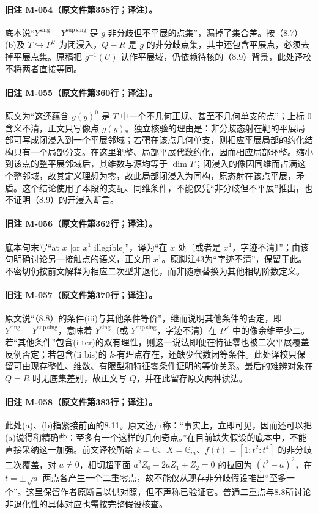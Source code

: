 \paragraph{旧注 M-054（原文件第358行；译注）。}
底本说“${Y^{\mathrm{sing}}}-{Y^{\mathrm{sup\,sing}}}$ 是 $g$ 非分歧但不平展的点集”，漏掉了集合差。按（8.7）(b)及 $T\hookrightarrow P^\vee$ 为闭浸入，$Q-R$ 是 $g$ 的非分歧点集，其中还包含平展点，必须去掉平展点集。原稿把 $g^{-1}(U)$ 认作平展域，仍依赖待核的（8.9）背景，此处译校不将两者直接等同。

\paragraph{旧注 M-055（原文件第360行；译注）。}
原文为“这还蕴含 $g(y)^0$ 是 $T$ 中一个不几何正规、甚至不几何单支的点”；上标 $0$ 含义不清，正文只写像点 $g(y)$。独立核验的理由是：非分歧态射在靶的平展局部可写成闭浸入到一个平展邻域；若靶在该点几何单支，则相应平展局部的约化结构只有一个局部分支。在这里靶整、局部平展代数约化，因而相应局部环整。缩小到该点的整平展邻域后，其维数与源均等于 $\dim T$；闭浸入的像因同维而占满这个整邻域，故其定义理想为零，故此局部闭浸入为同构，原态射在该点平展，矛盾。这个结论使用了本段的支配、同维条件，不能仅凭“非分歧但不平展”推出，也不证明（8.9）的开浸入断言。

\paragraph{旧注 M-056（原文件第362行；译注）。}
底本句末写“at $x$ [or $x^1$ illegible]”，译为“在 $x$ 处〔或者是 $x^1$，字迹不清〕”；由该句明确讨论另一接触点的语义，正文用 $x^1$。原脚注43为“字迹不清”，保留于此。不密切仍按前文解释为相应二次型非退化，而非随意替换为其他相切阶数定义。

\paragraph{旧注 M-057（原文件第370行；译注）。}
原文说“（8.8）的条件(iii)与其他条件等价”，继而说明其他条件的否定，即 ${Y^{\mathrm{sing}}}={Y^{\mathrm{sup\,sing}}}$，意味着 ${Y^{\mathrm{sing}}}$〔或 ${Y^{\mathrm{sup\,sing}}}$，字迹不清〕在 $P^\vee$ 中的像余维至少二。若“其他条件”包含(i ter)的双有理性，则这一说法即便在特征零也被二次平展覆盖反例否定；若包含(ii bis)的 $k$-有理点存在，还缺少代数闭等条件。此处译校只保留可由现存整性、维数、有限型和特征零条件证明的等价关系。最后的难辨对象在 $Q=R$ 时无底集差别，故正文写 $Q$，并在此留存原文两种读法。

\paragraph{旧注 M-058（原文件第383行；译注）。}
此处(a)、(b)指紧接前面的8.11。原文还声称：“事实上，立即可见，因而还可以把(a)说得稍精确些：至多有一个这样的几何奇点。”在目前缺失假设的底本中，不能直接采纳这一加强。前文译校所给 $k=\mathbb C$、$X=\mathbb G_m$、$f(t)=[1:t^2:t^4]$ 的非分歧二次覆盖，对 $a\ne0$，相切超平面 $a^2Z_0-2aZ_1+Z_2=0$ 的拉回为 $(t^2-a)^2$，在 $t=\pm\sqrt a$ 两点各产生一个二重零点，故不能仅从现存非分歧假设推出“至多一个”。这里保留作者原断言以供对照，但不声称已验证它。普通二重点与8.8所讨论非退化性的具体对应也需按完整假设核查。

